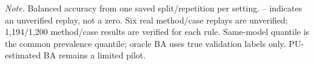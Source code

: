 \noindent\textit{Note.} Balanced accuracy from one saved split/repetition per setting. -- indicates an unverified replay, not a zero. Six real method/case replays are unverified; 1,194/1,200 method/case results are verified for each rule. Same-model quantile is the common prevalence quantile; oracle BA uses true validation labels only. PU-estimated BA remains a limited pilot.

\par\endgroup
